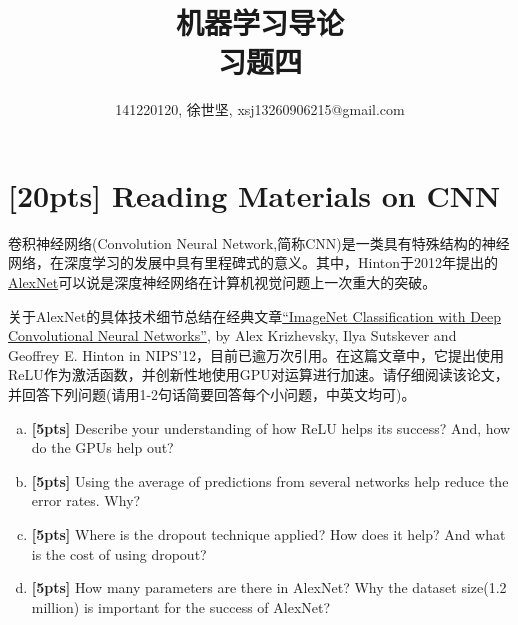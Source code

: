 \documentclass[a4paper,UTF8]{article}
\numberwithin{equation}{section}
\theoremstyle{definition}
\begin{document}
\title{机器学习导论\\
习题四}
\author{141220120, 徐世坚, xsj13260906215@gmail.com}
\maketitle
\section{\textbf{[20pts]} Reading Materials on CNN}
卷积神经网络(Convolution Neural Network,简称CNN)是一类具有特殊结构的神经网络，在深度学习的发展中具有里程碑式的意义。其中，Hinton于2012年提出的\href{https://en.wikipedia.org/wiki/AlexNet}{AlexNet}可以说是深度神经网络在计算机视觉问题上一次重大的突破。

关于AlexNet的具体技术细节总结在经典文章\href{https://papers.nips.cc/paper/4824-imagenet-classification-with-deep-convolutional-neural-networks}{“ImageNet Classification with Deep Convolutional Neural Networks”}, by Alex Krizhevsky, Ilya Sutskever and Geoffrey E. Hinton in NIPS'12，目前已逾万次引用。在这篇文章中，它提出使用ReLU作为激活函数，并创新性地使用GPU对运算进行加速。请仔细阅读该论文，并回答下列问题(请用1-2句话简要回答每个小问题，中英文均可)。

\begin{enumerate}[(a)]
\item \textbf{[5pts]} Describe your understanding of how ReLU helps its success? And, how do the GPUs help out?
\item \textbf{[5pts]} Using the average of predictions from several networks help reduce the error rates. Why?
\item \textbf{[5pts]} Where is the dropout technique applied? How does it help? And what is the cost of using dropout?
\item \textbf{[5pts]} How many parameters are there in AlexNet? Why the dataset size(1.2 million) is important for the success of AlexNet?
\end{enumerate}
\end{document}
